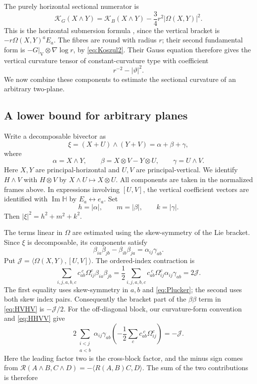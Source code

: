 \documentclass[12pt]{amsart}
\numberwithin{equation}{section}
\theoremstyle{remark}
\newcommand{\Hh}{\mathbb H}
\newcommand{\cK}{\mathcal K}
\newcommand{\ver}{\mathrm V}
\begin{document}
The purely horizontal sectional numerator is
\begin{equation}\label{eq:HHHH}
\cK_G(X\wedge Y)=\cK_B(X\wedge Y)
                  -\frac34r^2|\Omega(X,Y)|^2.
\end{equation}
This is the horizontal submersion formula \cite{ON}, since the vertical bracket
is \(-r\Omega(X,Y)^aE_a\). The fibres are round with radius \(r\);
their second fundamental form is
\(-G|_{\ver}\otimes\nabla\log r\), by \eqref{eq:Koszul2}.
Their Gauss equation therefore gives the vertical curvature tensor of
constant-curvature type with coefficient
\begin{equation}\label{eq:VVVV}
r^{-2}-|\vartheta|^2.
\end{equation}
We now combine these components to estimate the sectional curvature
of an arbitrary two-plane.

\subsection{A lower bound for arbitrary planes}
Write a decomposable bivector as
\[
\xi=(X+U)\wedge(Y+V)=\alpha+\beta+\gamma,
\]
where
\[
\alpha=X\wedge Y,\qquad
\beta=X\otimes V-Y\otimes U,\qquad
\gamma=U\wedge V.
\]
Here \(X,Y\) are principal-horizontal and \(U,V\) are
principal-vertical. We identify \(H\wedge V\) with \(H\otimes V\)
by \(X\wedge U\mapsto X\otimes U\). All components are taken in
the normalized frames above. In expressions involving \([U,V]\),
the vertical coefficient vectors are identified with
\(\operatorname{Im}\Hh\) by \(E_a\leftrightarrow e_a\). Set
\[
h=|\alpha|,\qquad m=|\beta|,\qquad k=|\gamma|.
\]
Then \(|\xi|^2=h^2+m^2+k^2\).

The terms linear in \(\Omega\) are estimated using the
skew-symmetry of the Lie bracket. Since \(\xi\) is decomposable,
its components satisfy
\begin{equation}\label{eq:Plucker}
\beta_{ia}\beta_{jb}-\beta_{ib}\beta_{ja}
       =\alpha_{ij}\gamma_{ab}.
\end{equation}
Put \(\mathcal J=\langle\Omega(X,Y),[U,V]\rangle\).
The ordered-index contraction is
\[
 \sum_{i,j,a,b,c}c_{ab}^{\ c}\Omega_{ij}^c\beta_{ia}\beta_{jb}
 =\frac12\sum_{i,j,a,b,c}
       c_{ab}^{\ c}\Omega_{ij}^c\alpha_{ij}\gamma_{ab}
 =2\mathcal J.
\]
The first equality uses skew-symmetry in \(a,b\) and
\eqref{eq:Plucker}; the second uses both skew index pairs.
Consequently the bracket part of the \(\beta\beta\) term in
\eqref{eq:HVHV} is \(-\mathcal J/2\).
For the off-diagonal block, our curvature-form convention and
\eqref{eq:HHVV} give
\[
 2\sum_{\substack{i<j\\a<b}}\alpha_{ij}\gamma_{ab}
       \left(-\frac12\sum_c c_{ab}^{\ c}\Omega_{ij}^c\right)
 =-\mathcal J.
\]
Here the leading factor two is the cross-block factor, and the
minus sign comes from
\(\mathcal R(A\wedge B,C\wedge D)=-\langle R(A,B)C,D\rangle\).
The sum of the two contributions is therefore
\end{document}
